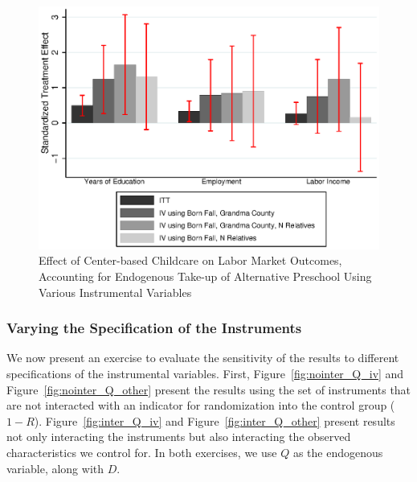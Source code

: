 \begin{figure}[H]
		\caption{Effect of Center-based Childcare on Labor Market Outcomes, Accounting for Endogenous Take-up of Alternative Preschool Using Various Instrumental Variables} \label{fig:ins_inter_Q_iv2}
		\includegraphics[width=.7\columnwidth]{output/appendixplots/ins_inter_Q_iv_other.eps}
\end{figure}

\subsubsection{Varying the Specification of the Instruments}

\noindent We now present an exercise to evaluate the sensitivity of the results to different specifications of the instrumental variables. First, Figure~\ref{fig:nointer_Q_iv} and Figure~\ref{fig:nointer_Q_other} present the results using the set of instruments that are not interacted with an indicator for randomization into the control group ($1-R$). Figure~\ref{fig:inter_Q_iv} and Figure~\ref{fig:inter_Q_other} present results not only interacting the instruments but also interacting the observed characteristics we control for. In both exercises, we use $Q$ as the endogenous variable, along with $D$.\\

